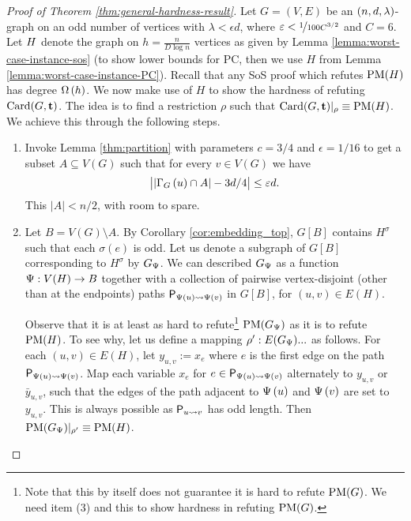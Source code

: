 \documentclass[11pt]{article}
\begin{document}
\begin{proof}[Proof of Theorem \ref{thm:general-hardness-result}]
Let $G=(V,E)$ be an $\EnDeeLambda$-graph on an odd number of vertices with $\lambda < \epsilon d$, where $\epsilon < \nicefrac{1}{100C^{3/2}}$ and $C=6$. Let $\HardInstance$ denote the graph on $h=\frac{n}{D \log n}$ vertices as given by Lemma \ref{lemma:worst-case-instance-sos} (to show lower bounds for PC, then we use $H$ from Lemma \ref{lemma:worst-case-instance-PC}). Recall that any SoS proof which refutes $\PM{H}$ has degree $\BigOmega{h}$. We now make use of $H$ to show the hardness of refuting $\Card{G, \vec{t}}$. The idea is to find a restriction $\rho$ such that $\Card{G, \vec{t}}|_\rho \equiv \PM{H}$. We achieve this through the following steps.

\begin{enumerate}
\item{Invoke Lemma  \ref{thm:partition} with parameters $c=3/4$ and $\epsilon = 1/16$ to get a subset $A \subseteq V(G)$ such that for every $v \in V(G)$ we have 
\begin{equation} \label{eq:size_nbr_A}
    \bigl| \Size{\Neighbourhood{G}{u} \cap A} - 3d/4 \bigr| \leq \epsilon d.
\end{equation}
This $|A| < n/2$, with room to spare.
}

\item{Let $B = V(G) \setminus A$. By Corollary \ref{cor:embedding_top}, $G[B]$ contains $H^{\sigma}$ such that each $\sigma(e)$ is odd. Let us denote a subgraph of $G[B]$ corresponding to $H^{\sigma}$ by $G_{\EmbeddingFunc}$. We can described $G_\EmbeddingFunc$ as a function $\EmbeddingFunc: V(H) \to B$ together with a collection of pairwise vertex-disjoint (other than at the endpoints) paths  $\Path{\Embedding{u}}{\Embedding{v}}$ in $G[B]$, for $(u,v) \in E(H)$.

    Observe that it is at least as hard to refute\footnote{Note that this by itself does not guarantee it is hard to refute $\PM{G}$. We need item (3) and this to show hardness in refuting $\PM{G}$.} $\PM{G_{\EmbeddingFunc}}$ as it is to refute $\PM{H}$.
    To see why, let us define a mapping $\rho': E(G_\EmbeddingFunc) ...$ as follows. For each $(u,v) \in E(H)$, let $y_{u,v} := x_e$ where $e$ is the first edge on the path $\Path{\Embedding{u}}{\Embedding{v}}$. Map each variable $x_e$ for $e \in \Path{\Embedding{u}}{\Embedding{v}}$ alternately to $y_{u,v}$ or $\bar{y}_{u,v}$, such that the edges of the path adjacent to $\Embedding{u}$ and $\Embedding{v}$ are set to $y_{u,v}$. This is always possible as $\Path{u}{v}$ has odd length. Then $\PM{G_\EmbeddingFunc}|_{\rho'} \equiv \PM{H}$.
  }


\end{enumerate}
\end{proof}
\end{document}
